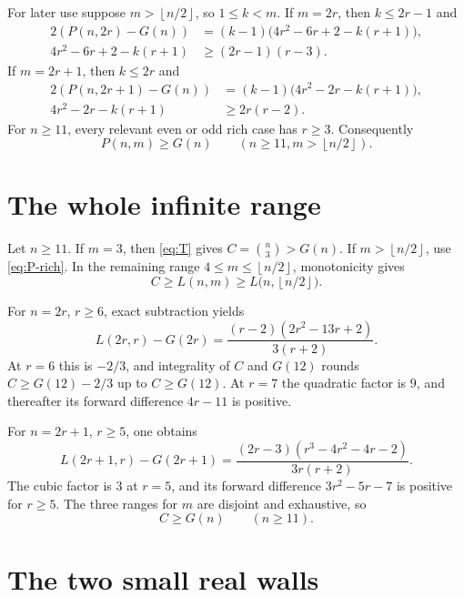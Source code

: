 \documentclass[11pt]{article}
\theoremstyle{definition}
\theoremstyle{remark}
\newcommand{\floor}[1]{\left\lfloor #1\right\rfloor}
\begin{document}
For later use suppose \(m>\floor{n/2}\), so \(1\leq k<m\).  If \(m=2r\),
then \(k\leq2r-1\) and
\begin{align}
 2(P(n,2r)-G(n))
  &=(k-1)\bigl(4r^2-6r+2-k(r+1)\bigr),\label{eq:P-even}\\
 4r^2-6r+2-k(r+1)
  &\geq(2r-1)(r-3).\nonumber
\end{align}
If \(m=2r+1\), then \(k\leq2r\) and
\begin{align}
 2(P(n,2r+1)-G(n))
  &=(k-1)\bigl(4r^2-2r-k(r+1)\bigr),\label{eq:P-odd}\\
 4r^2-2r-k(r+1)&\geq2r(r-2).\nonumber
\end{align}
For \(n\geq11\), every relevant even or odd rich case has \(r\geq3\).
Consequently
\begin{equation}\label{eq:P-rich}
 P(n,m)\geq G(n)
 \qquad(n\geq11, m>\floor{n/2}).
\end{equation}

\section{The whole infinite range}

Let \(n\geq11\).  If \(m=3\), then \eqref{eq:T} gives
\(C=\binom n3>G(n)\).  If \(m>\floor{n/2}\), use
\eqref{eq:P-rich}.  In the remaining range
\(4\leq m\leq\floor{n/2}\), monotonicity gives
\[
 C\geq L(n,m)\geq L\bigl(n,\floor{n/2}\bigr).
\]

For \(n=2r\), \(r\geq6\), exact subtraction yields
\begin{equation}\label{eq:large-even}
 L(2r,r)-G(2r)
 =\frac{(r-2)(2r^2-13r+2)}{3(r+2)}.
\end{equation}
At \(r=6\) this is \(-2/3\), and integrality of \(C\) and \(G(12)\) rounds
\(C\geq G(12)-2/3\) up to \(C\geq G(12)\).  At \(r=7\) the quadratic factor
is \(9\), and thereafter its forward difference \(4r-11\) is positive.

For \(n=2r+1\), \(r\geq5\), one obtains
\begin{equation}\label{eq:large-odd}
 L(2r+1,r)-G(2r+1)
 =\frac{(2r-3)(r^3-4r^2-4r-2)}{3r(r+2)}.
\end{equation}
The cubic factor is \(3\) at \(r=5\), and its forward difference
\(3r^2-5r-7\) is positive for \(r\geq5\).  The three ranges for \(m\) are
disjoint and exhaustive, so
\begin{equation}\label{eq:large-result}
 C\geq G(n)\qquad(n\geq11).
\end{equation}

\section{The two small real walls}
\end{document}
